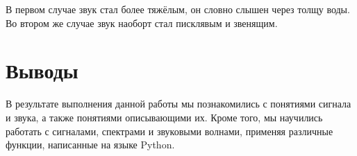 \documentclass[a4paper,12pt]{report}
\begin{document}
    В первом случае звук стал более тяжёлым, он словно слышен через толщу воды. Во втором же случае звук наоборт стал писклявым и звенящим.

\chapter{Выводы}
    В результате выполнения данной работы мы познакомились с понятиями сигнала и звука, а также понятиями описывающими их. Кроме того, мы научились работать с сигналами, спектрами и звуковыми волнами, применяя различные функции, написанные на языке Python.
\end{document}
